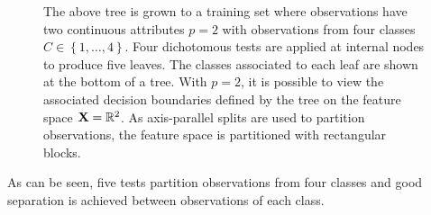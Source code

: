 \begin{figure}
\centering
{}
\caption{The above tree is grown to a training set where observations have two continuous attributes $p=2$ with observations from four classes $C\in\left\{1,\ldots,4\right\}$. Four dichotomous tests are applied at internal nodes to produce five leaves. The classes associated to each leaf are shown at the bottom of a tree. With $p=2$, it is possible to view the associated decision boundaries defined by the tree on the feature space $\mathbf{X}=\mathbb{R}^2$. As axis-parallel splits are used to partition observations, the feature space is partitioned with rectangular blocks.}
\label{fig_typical_CART_tree}
\end{figure}
As can be seen, five tests partition observations from four classes and good separation is achieved between observations of each class.\\

